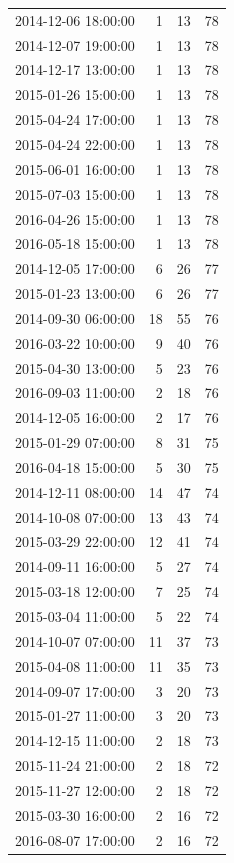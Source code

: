 \begin{tabular}{lrrr}
2014-12-06 18:00:00 & 1 & 13 & 78 \\
2014-12-07 19:00:00 & 1 & 13 & 78 \\
2014-12-17 13:00:00 & 1 & 13 & 78 \\
2015-01-26 15:00:00 & 1 & 13 & 78 \\
2015-04-24 17:00:00 & 1 & 13 & 78 \\
2015-04-24 22:00:00 & 1 & 13 & 78 \\
2015-06-01 16:00:00 & 1 & 13 & 78 \\
2015-07-03 15:00:00 & 1 & 13 & 78 \\
2016-04-26 15:00:00 & 1 & 13 & 78 \\
2016-05-18 15:00:00 & 1 & 13 & 78 \\
2014-12-05 17:00:00 & 6 & 26 & 77 \\
2015-01-23 13:00:00 & 6 & 26 & 77 \\
2014-09-30 06:00:00 & 18 & 55 & 76 \\
2016-03-22 10:00:00 & 9 & 40 & 76 \\
2015-04-30 13:00:00 & 5 & 23 & 76 \\
2016-09-03 11:00:00 & 2 & 18 & 76 \\
2014-12-05 16:00:00 & 2 & 17 & 76 \\
2015-01-29 07:00:00 & 8 & 31 & 75 \\
2016-04-18 15:00:00 & 5 & 30 & 75 \\
2014-12-11 08:00:00 & 14 & 47 & 74 \\
2014-10-08 07:00:00 & 13 & 43 & 74 \\
2015-03-29 22:00:00 & 12 & 41 & 74 \\
2014-09-11 16:00:00 & 5 & 27 & 74 \\
2015-03-18 12:00:00 & 7 & 25 & 74 \\
2015-03-04 11:00:00 & 5 & 22 & 74 \\
2014-10-07 07:00:00 & 11 & 37 & 73 \\
2015-04-08 11:00:00 & 11 & 35 & 73 \\
2014-09-07 17:00:00 & 3 & 20 & 73 \\
2015-01-27 11:00:00 & 3 & 20 & 73 \\
2014-12-15 11:00:00 & 2 & 18 & 73 \\
2015-11-24 21:00:00 & 2 & 18 & 72 \\
2015-11-27 12:00:00 & 2 & 18 & 72 \\
2015-03-30 16:00:00 & 2 & 16 & 72 \\
2016-08-07 17:00:00 & 2 & 16 & 72 \\

\end{tabular}
